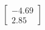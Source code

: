 \documentclass[preview]{standalone}
\begin{document}
\begin{align*}
\begin{bmatrix} -4.69 \\ 2.85 \end{bmatrix}
\end{align*}
\end{document}
